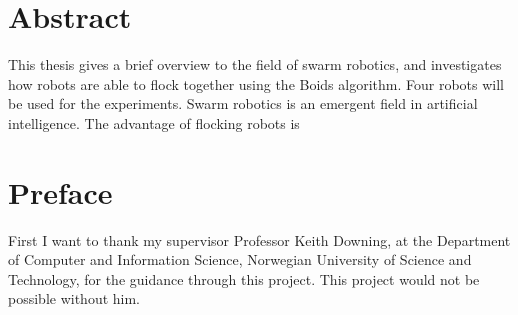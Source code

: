\section*{Abstract}
\label{sec:abstract}

This thesis gives a brief overview to the field of swarm robotics, and investigates how robots are able to flock together using the Boids algorithm. Four robots will be used for the experiments. Swarm robotics is an emergent field in artificial intelligence. The advantage of flocking robots is 


%
%

\clearpage

\section*{Preface}



\vspace{1cm}

First I want to thank my supervisor Professor Keith Downing, at the Department of Computer and Information Science, Norwegian University of Science and Technology, for the guidance through this project. This project would not be possible without him.

